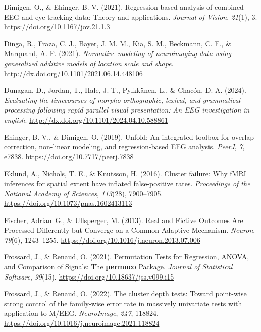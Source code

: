 \documentclass[
  doc,
  floatsintext,
  longtable,
  a4paper,
  nolmodern,
  notxfonts,
  notimes,
  colorlinks=true,linkcolor=blue,citecolor=blue,urlcolor=blue]{apa7}
\newlength{\cslhangindent}
\newenvironment{CSLReferences}[2] %
 {\begin{list}{}{%
  \setlength{\itemindent}{0pt}
  \setlength{\leftmargin}{0pt}
  \setlength{\parsep}{0pt}
  \ifodd #1
   \setlength{\leftmargin}{\cslhangindent}
   \setlength{\itemindent}{-1\cslhangindent}
  \fi
  \setlength{\itemsep}{#2\baselineskip}}}
 {\end{list}}
\begin{document}
\begin{CSLReferences}{1}{0}
Dimigen, O., \& Ehinger, B. V. (2021). Regression-based analysis of
combined EEG and eye-tracking data: Theory and applications.
\emph{Journal of Vision}, \emph{21}(1), 3.
\url{https://doi.org/10.1167/jov.21.1.3}

Dinga, R., Fraza, C. J., Bayer, J. M. M., Kia, S. M., Beckmann, C. F.,
\& Marquand, A. F. (2021). \emph{Normative modeling of neuroimaging data
using generalized additive models of location scale and shape}.
\url{http://dx.doi.org/10.1101/2021.06.14.448106}

Dunagan, D., Jordan, T., Hale, J. T., Pylkkänen, L., \& Chacón, D. A.
(2024). \emph{Evaluating the timecourses of morpho-orthographic,
lexical, and grammatical processing following rapid parallel visual
presentation: An EEG investigation in english}.
\url{http://dx.doi.org/10.1101/2024.04.10.588861}

Ehinger, B. V., \& Dimigen, O. (2019). Unfold: An integrated toolbox for
overlap correction, non-linear modeling, and regression-based {EEG}
analysis. \emph{PeerJ}, \emph{7}, e7838.
\url{https://doi.org/10.7717/peerj.7838}

Eklund, A., Nichols, T. E., \& Knutsson, H. (2016). Cluster failure: Why
fMRI inferences for spatial extent have inflated false-positive rates.
\emph{Proceedings of the National Academy of Sciences}, \emph{113}(28),
7900--7905. \url{https://doi.org/10.1073/pnas.1602413113}

Fischer, Adrian~G., \& Ullsperger, M. (2013). Real and Fictive Outcomes
Are Processed Differently but Converge on a Common Adaptive Mechanism.
\emph{Neuron}, \emph{79}(6), 1243--1255.
\url{https://doi.org/10.1016/j.neuron.2013.07.006}

Frossard, J., \& Renaud, O. (2021). Permutation Tests for Regression,
ANOVA, and Comparison of Signals: The {\textbf{permuco}} Package.
\emph{Journal of Statistical Software}, \emph{99}(15).
\url{https://doi.org/10.18637/jss.v099.i15}

Frossard, J., \& Renaud, O. (2022). The cluster depth tests: Toward
point-wise strong control of the family-wise error rate in massively
univariate tests with application to M/EEG. \emph{NeuroImage},
\emph{247}, 118824.
\url{https://doi.org/10.1016/j.neuroimage.2021.118824}


\end{CSLReferences}
\end{document}
